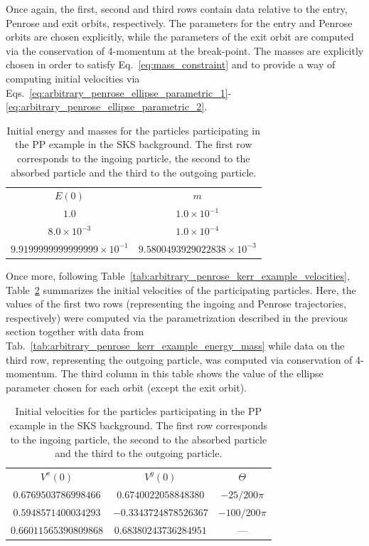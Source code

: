 Once again, the first, second and third rows contain data relative to the entry, Penrose and exit orbits, respectively. The parameters for the entry and Penrose orbits are chosen explicitly, while the parameters of the exit orbit are computed via the conservation of 4-momentum at the break-point. The masses are explicitly chosen in order to satisfy Eq.~\eqref{eq:mass_constraint} and to provide a way of computing initial velocities via Eqs.~\eqref{eq:arbitrary_penrose_ellipse_parametric_1}-\eqref{eq:arbitrary_penrose_ellipse_parametric_2}.
%
\begin{table}[]
  \centering
  \begin{tabular}{cc}
    \hline\hline
    $E(0)$                              & $m$                                 \\
    $1.0$                               & $1.0 \times 10^{-1}$                \\
    $8.0 \times 10^{-3}$                & $1.0 \times 10^{-4}$                \\
    $9.9199999999999999 \times 10^{-1}$ & $9.5800493929022838 \times 10^{-3}$ \\ \hline\hline
  \end{tabular}
  \caption{Initial energy and masses for the particles participating in the \ac{PP} example in the \ac{SKS} background. The first row corresponds to the ingoing particle, the second to the absorbed particle and the third to the outgoing particle.}
  \label{tab:arbitrary_penrose_sks_example_energy_mass}
\end{table}

Once more, following Table~\ref{tab:arbitrary_penrose_kerr_example_velocities}, Table~\ref{tab:arbitrary_penrose_sks_example_velocities} summarizes the initial velocities of the participating particles. Here, the values of the first two rows (representing the ingoing and Penrose trajectories, respectively) were computed via the parametrization described in the previous section together with data from Tab.~\ref{tab:arbitrary_penrose_kerr_example_energy_mass} while data on the third row, representing the outgoing particle, was computed via conservation of 4-momentum. The third column in this table shows the value of the ellipse parameter chosen for each orbit (except the exit orbit).
%
\begin{table}[]
  \centering
  \begin{tabular}{ccc}
    \hline\hline
    $V^x(0)$              & $V^y(0)$              & $\Theta$       \\
    $0.6769503786998466$  & $0.6740022058848380$  & $-25/200 \pi$  \\
    $0.5948571400034293$  & $-0.3343724878526367$ & $-100/200 \pi$ \\
    $0.66011565390809868$ & $0.68380243736284951$ & ---            \\ \hline\hline
  \end{tabular}
  \caption{Initial velocities for the particles participating in the \ac{PP} example in the \ac{SKS} background. The first row corresponds to the ingoing particle, the second to the absorbed particle and the third to the outgoing particle.}
  \label{tab:arbitrary_penrose_sks_example_velocities}
\end{table}

